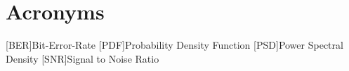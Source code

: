 \chapter{Acronyms}
\begin{acronym}[PDF]
    [BER]{Bit-Error-Rate}
    [PDF]{Probability Density Function}
    [PSD]{Power Spectral Density}
    [SNR]{Signal to Noise Ratio}
\end{acronym}
